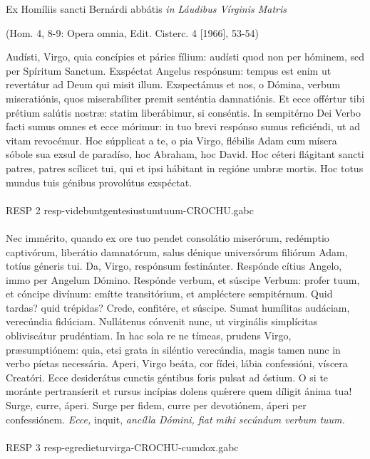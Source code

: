 \documentclass[options]{article}
\begin{document}
	Ex Homíliis sancti Bernárdi abbátis \emph{in Láudibus Vírginis Matris}
	\begin{flushright}
		(Hom. 4, 8-9: Opera omnia, Edit. Cisterc. 4 [1966], 53-54)	
	\end{flushright}
	Audísti, Virgo, quia concípies et páries fílium: audísti quod non per hóminem, sed per Spíritum Sanctum. Exspéctat Angelus respónsum: tempus est enim ut revertátur ad Deum qui misit illum. Exspectámus et nos, o Dómina, verbum miseratiónis, quos miserabíliter premit senténtia damnatiónis.
	Et ecce offértur tibi prétium salútis nostræ: statim liberábimur, si conséntis. In sempitérno Dei Verbo facti sumus omnes et ecce mórimur: in tuo brevi respónso sumus reficiéndi, ut ad vitam revocémur.
	Hoc súpplicat a te, o pia Virgo, flébilis Adam cum mísera sóbole sua exsul de paradíso, hoc Abraham, hoc David. Hoc céteri flágitant sancti patres, patres scílicet tui, qui et ipsi hábitant in regióne umbræ mortis. Hoc totus mundus tuis génibus provolútus exspéctat.\\
	\\
	RESP 2  resp-videbuntgentesiustumtuum-CROCHU.gabc\\
	\\
	Nec immérito, quando ex ore tuo pendet consolátio miserórum, redémptio captivórum, liberátio damnatórum, salus dénique universórum filiórum Adam, totíus géneris tui.
	Da, Virgo, respónsum festinánter. Respónde cítius Angelo, immo per Angelum Dómino. Respónde verbum, et súscipe Verbum: profer tuum, et cóncipe divínum: emítte transitórium, et ampléctere sempitérnum.
	Quid tardas? quid trépidas? Crede, confitére, et súscipe. Sumat humílitas audáciam, verecúndia fidúciam. Nullátenus cónvenit nunc, ut virginális simplícitas obliviscátur prudéntiam. In hac sola re ne tímeas, prudens Virgo, præsumptiónem: quia, etsi grata in siléntio verecúndia, magis tamen nunc in verbo píetas necessária.
	Aperi, Virgo beáta, cor fídei, lábia confessióni, víscera Creatóri. Ecce desiderátus cunctis géntibus foris pulsat ad óstium. O si te moránte pertransíerit et rursus incípias dolens qu\'{æ}rere quem díligit ánima tua! Surge, curre, áperi. Surge per fidem, curre per devotiónem, áperi per confessiónem. \emph{Ecce,} inquit, \emph{ancílla Dómini, fiat mihi secúndum verbum tuum.}\\
	\\
	RESP 3  resp-egredieturvirga-CROCHU-cumdox.gabc
\end{document}
